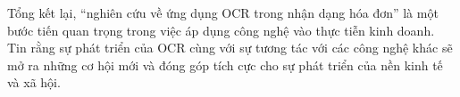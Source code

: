 Tổng kết lại, ``nghiên cứu về ứng dụng OCR trong nhận dạng hóa đơn'' là một bước tiến quan trọng trong việc áp dụng công nghệ vào thực tiễn kinh doanh. Tin rằng sự phát triển của OCR cùng với sự tương tác với các công nghệ khác sẽ mở ra những cơ hội mới và đóng góp tích cực cho sự phát triển của nền kinh tế và xã hội.




